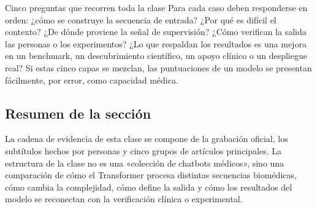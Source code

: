 


\begin{importantbox}{Cinco preguntas que recorren toda la clase}
Para cada caso deben responderse en orden: ¿cómo se construye la secuencia de entrada? ¿Por qué es difícil el contexto? ¿De dónde proviene la señal de supervisión? ¿Cómo verifican la salida las personas o los experimentos? ¿Lo que respaldan los resultados es una mejora en un benchmark, un descubrimiento científico, un apoyo clínico o un despliegue real? Si estas cinco capas se mezclan, las puntuaciones de un modelo se presentan fácilmente, por error, como capacidad médica.
\end{importantbox}

\subsection{Resumen de la sección}

La cadena de evidencia de esta clase se compone de la grabación oficial, los subtítulos hechos por personas y cinco grupos de artículos principales. La estructura de la clase no es una «colección de chatbots médicos», sino una comparación de cómo el Transformer procesa distintas secuencias biomédicas, cómo cambia la complejidad, cómo define la salida y cómo los resultados del modelo se reconectan con la verificación clínica o experimental.
